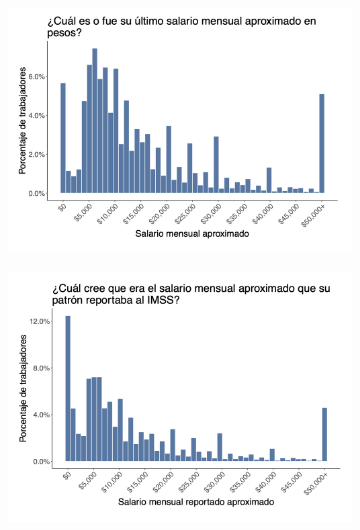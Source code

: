 \documentclass[oneside,11pt]{article}
\begin{document}
\begin{figure}[H]
    \caption{Worker Survey Graphs}
    \label{worker_survey_2}
    \begin{center}

    \begin{subfigure}{0.49\textwidth}
    \includegraphics[width=\textwidth]{04_Figures/worker_survey/Exp_7.png}
    \end{subfigure}
    \begin{subfigure}{0.49\textwidth}
    \includegraphics[width=\textwidth]{04_Figures/worker_survey/Exp_8.png}
    \end{subfigure}
    

\end{center}
\end{figure}
\end{document}
